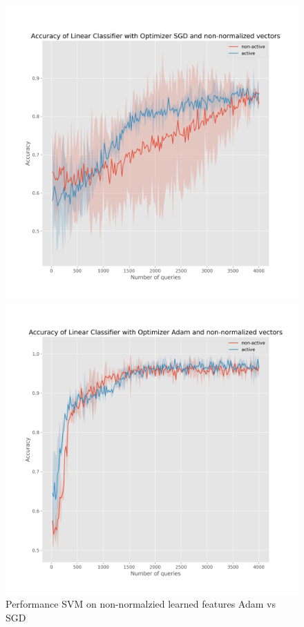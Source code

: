 \documentclass{article}
\begin{document}
\begin{figure}[!h]
  \centering
  \begin{minipage}{.55\textwidth}
    \centering
    \includegraphics[width=\linewidth]{active-vs-base-moons-linear-loss-SGD-non-normalized-ci}
  \end{minipage}%
  \begin{minipage}{.55\textwidth}
    \centering
    \includegraphics[width=\linewidth]{active-vs-base-moons-linear-loss-Adam-non-normalized-ci}
  \end{minipage}
  \caption{Performance SVM on non-normalzied learned features Adam vs SGD}
  \label{fig:svm-non-normalized-ci}
\end{figure}
\end{document}
